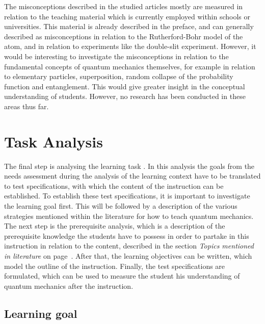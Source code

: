 \documentclass[11pt,twoside]{report} %
\begin{document}
The misconceptions described in the studied articles mostly are measured in relation to the teaching material which is currently employed within schools or universities. This material is already described in the preface, and can generally described as misconceptions in relation to the Rutherford-Bohr model of the atom, and in relation to experiments like the double-slit experiment. However, it would be interesting to investigate the misconceptions in relation to the fundamental concepts of quantum mechanics themselves, for example in relation to elementary particles, superposition, random collapse of the probability function and entanglement. This would give greater insight in the conceptual understanding of students. However, no research has been conducted in these areas thus far.


\section{Task Analysis}

The final step is analysing the learning task \cite{smithragan}. In this analysis the goals from the needs assessment during the analysis of the learning context have to be translated to test specifications, with which the content of the instruction can be established. To establish these test specifications, it is important to investigate the learning goal first. This will be followed by a description of the various strategies mentioned within the literature for how to teach quantum mechanics. The next step is the prerequisite analysis, which is a description of the prerequisite knowledge the students have to possess in order to partake in this instruction in relation to the content, described in the section \emph{Topics mentioned in literature} on page~\pageref{sssec:topicsliterature}. After that, the learning objectives can be written, which model the outline of the instruction. Finally, the test specifications are formulated, which can be used to measure the student his understanding of quantum mechanics after the instruction.

\subsection{Learning goal}
\end{document}
